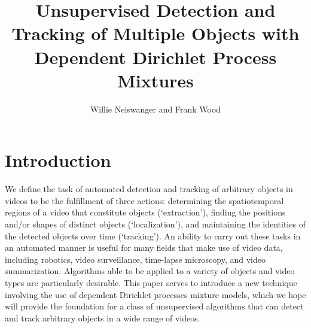 \documentclass[smallcondensed, final]{svjour3}
\begin{document}
\title{Unsupervised Detection and Tracking of Multiple Objects with Dependent Dirichlet Process Mixtures}
\author{Willie Neiswanger and Frank Wood}
\maketitle
\mbox{}




\section{Introduction}

We define the task of automated detection and tracking of arbitrary objects in videos to be the fulfillment of three actions: determining the spatiotemporal regions of a video that constitute objects (`extraction'), finding the positions and/or shapes of distinct objects (`localization'), and maintaining the identities of the detected objects over time (`tracking'). An ability to carry out these tasks in an automated manner is useful for many fields that make use of video data, including robotics, video surveillance, time-lapse microscopy, and video summarization. Algorithms able to be applied to a variety of objects and video types are particularly desirable. This paper serves to introduce a new technique involving the use of dependent Dirichlet processes mixture models, which we hope will provide the foundation for a class of unsupervised algorithms that can detect and track arbitrary objects in a wide range of videos.
\end{document}
